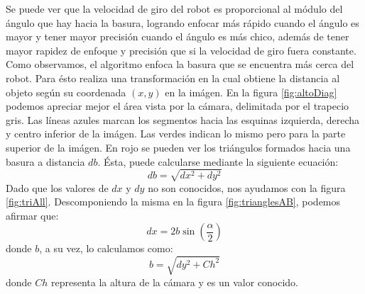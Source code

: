 Se puede ver que la velocidad de giro del robot es proporcional al m\'odulo del
\'angulo que hay hacia la basura, logrando enfocar m\'as r\'apido cuando el
\'angulo es mayor y tener mayor precisi\'on cuando el \'angulo es m\'as chico,
adem\'as de tener mayor rapidez de enfoque y precisi\'on que si la velocidad de
giro fuera constante.
\\\indent Como observamos, el algoritmo enfoca la basura que se encuentra m\'as
cerca del robot. Para \'esto realiza una transformaci\'on en la cual obtiene
la distancia al objeto seg\'un su coordenada $(x,y)$ en la im\'agen. En la figura
\ref{fig:altoDiag} podemos apreciar mejor el \'area vista por la c\'amara,
delimitada por el trapecio gris. Las l\'ineas azules marcan los segmentos hacia
las esquinas izquierda, derecha y centro inferior de la im\'agen. Las verdes
indican lo mismo pero para la parte superior de la im\'agen. En rojo se pueden
ver los tri\'angulos formados hacia una basura a distancia $db$. \'Esta, puede
calcularse mediante la siguiente ecuaci\'on:
\begin{equation}
db=\sqrt{dx^2 + dy^2}
\label{eq:posta}
\end{equation}
Dado que los valores de $dx$ y $dy$ no son conocidos, nos ayudamos con la figura
\ref{fig:triAll}. Descomponiendo la misma en la figura \ref{fig:trianglesAB},
podemos afirmar que:
\begin{equation}
dx=2b \sin(\frac{\alpha}{2})
\label{eq:asin}
\end{equation}
donde $b$, a su vez, lo calculamos como:
\begin{equation}
b=\sqrt{dy^2 + Ch^2}
\label{eq:depc}
\end{equation}
donde $Ch$ representa la altura de la c\'amara y es un valor conocido.\\

